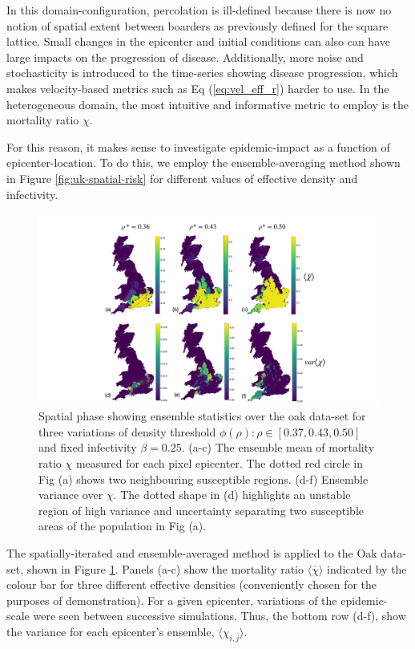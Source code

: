 In this domain-configuration, percolation is ill-defined because there is now no notion of spatial extent between boarders as previously defined for the square lattice. %
Small changes in the epicenter and initial conditions can also can have large impacts on the progression of disease. %
Additionally, more noise and stochasticity is introduced to the time-series showing disease progression, which makes velocity-based metrics such as Eq (\ref{eq:vel_eff_r}) harder to use. %
In the heterogeneous domain, the most intuitive and informative metric to employ is the mortality ratio $\chi$. %

For this reason, it makes sense to investigate epidemic-impact as a function of epicenter-location. %
To do this, we employ the ensemble-averaging method shown in Figure \ref{fig:uk-spatial-risk} for different values of effective density and infectivity. %

\begin{figure}
    \centering
    \includegraphics[scale=0.4]{chapter4/figures/figure5.pdf}
    \caption{Spatial phase showing ensemble statistics over the oak data-set for three variations of density threshold $\phi(\rho): \rho \in [0.37, 0.43, 0.50]$ and fixed infectivity $\beta=0.25$. (a-c) The ensemble mean of mortality ratio $\chi$ measured for each pixel epicenter. The dotted red circle in Fig (a) shows two neighbouring susceptible regions. (d-f) Ensemble variance over $\chi$. The dotted shape in (d) highlights an unstable region of high variance and uncertainty separating two susceptible areas of the population in Fig (a).}
    \label{fig:oak-spatial-ensemble}
\end{figure}

The spatially-iterated and ensemble-averaged method is applied to the Oak data-set, shown in Figure \ref{fig:oak-spatial-ensemble}. %
Panels (a-c) show the mortality ratio $\big\langle \overline{\chi} \big\rangle$ indicated by the colour bar for three different effective densities (conveniently chosen for the purposes of demonstration). %
For a given epicenter, variations of the epidemic-scale were seen between successive simulations. %
Thus, the bottom row (d-f), show the variance for each epicenter's ensemble, $\langle \chi_{i,j} \rangle$. %

